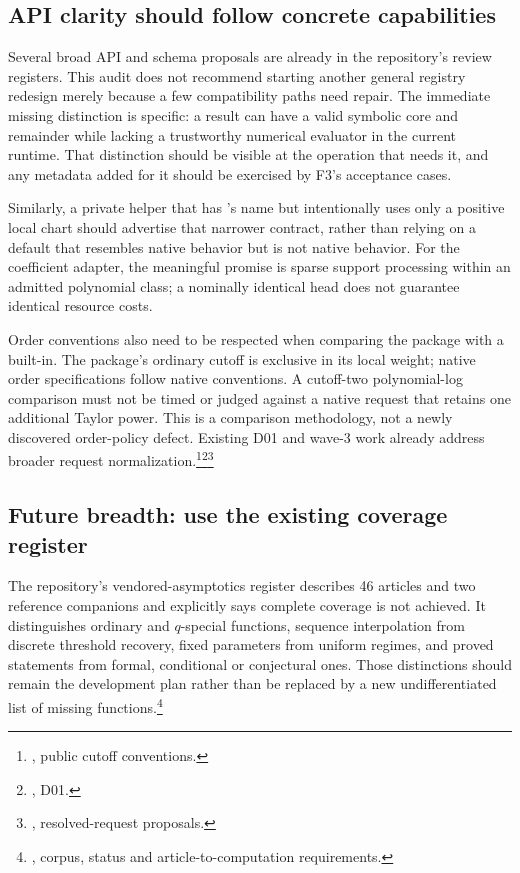\documentclass[11pt,letterpaper]{article}
\newcommand{\code}[1]{\texttt{\detokenize{#1}}}
\newcommand{\src}[2]{\footnote{\cite{#1}, #2.}}
\begin{document}
\subsection{API clarity should follow concrete capabilities}

Several broad API and schema proposals are already in the repository's review registers. This audit does not recommend starting another general registry redesign merely because a few compatibility paths need repair. The immediate missing distinction is specific: a result can have a valid symbolic core and remainder while lacking a trustworthy numerical evaluator in the current runtime. That distinction should be visible at the operation that needs it, and any metadata added for it should be exercised by F3's acceptance cases.

Similarly, a private helper that has \code{Limit}'s name but intentionally uses only a positive local chart should advertise that narrower contract, rather than relying on a default that resembles native behavior but is not native behavior. For the coefficient adapter, the meaningful promise is sparse support processing within an admitted polynomial class; a nominally identical head does not guarantee identical resource costs.

Order conventions also need to be respected when comparing the package with a built-in. The package's ordinary cutoff is exclusive in its local weight; native order specifications follow native conventions. A cutoff-two polynomial-log comparison must not be timed or judged against a native request that retains one additional Taylor power. This is a comparison methodology, not a newly discovered order-policy defect. Existing D01 and wave-3 work already address broader request normalization.\src{core}{public cutoff conventions}\src{status}{D01}\src{wave3}{resolved-request proposals}

\subsection{Future breadth: use the existing coverage register}

The repository's vendored-asymptotics register describes 46 articles and two reference companions and explicitly says complete coverage is not achieved. It distinguishes ordinary and $q$-special functions, sequence interpolation from discrete threshold recovery, fixed parameters from uniform regimes, and proved statements from formal, conditional or conjectural ones. Those distinctions should remain the development plan rather than be replaced by a new undifferentiated list of missing functions.\src{coverage}{corpus, status and article-to-computation requirements}
\end{document}
